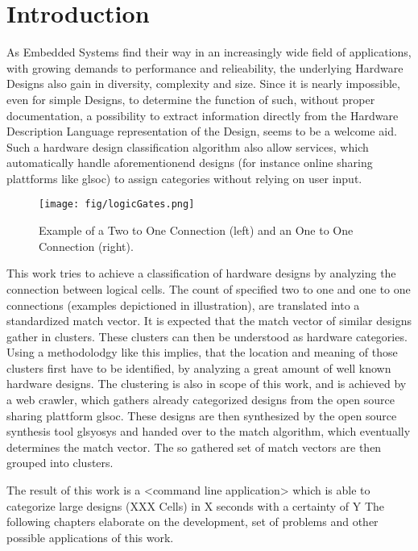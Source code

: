 
\section{Introduction}
As Embedded Systems find their way in an increasingly wide field of applications,
with growing demands to performance and relieability, the underlying Hardware 
Designs also gain in diversity, complexity and size. Since it is nearly impossible,
even for simple Designs, to determine the function of such, without proper
documentation, a possibility to extract information directly from the Hardware 
Description Language representation of the Design, seems to be a welcome aid.
Such a hardware design classification algorithm also allow services, which 
automatically handle aforementionend designs (for instance online sharing 
plattforms like gls{oc}) to assign categories without relying on user input.

\begin{figure}[h]
 \centering
 \texttt{[image: fig/logicGates.png]}
 \caption[Example of a Two to One Connection and an One to One Connection]{Example of a Two to One Connection (left) and an One to One Connection (right).}
 \label{fig:logicGates}
\end{figure}

This work tries to achieve a classification of hardware designs by analyzing the 
connection between logical cells. The count of specified two to one and one to 
one connections (examples depictioned in illustration), are translated into a
standardized match vector. It is expected that the match vector of similar designs
gather in clusters. These clusters can then be understood as hardware categories. 
Using a methodolodgy like this implies, that the location and meaning of those clusters first 
have to be identified, by analyzing a great amount of well known hardware designs.
The clustering is also in scope of this work, and is achieved by a web crawler,
which gathers already categorized designs from the open source sharing plattform 
gls{oc}. These designs are then synthesized by the open source synthesis tool 
gls{yosys} and handed over to the match algorithm, which eventually determines 
the match vector. The so gathered set of match vectors are then grouped into clusters.

The result of this work is a <command line application> which is able to 
categorize large designs (XXX Cells) in X seconds with a certainty of Y%
The following chapters elaborate on the development, set of problems and 
other possible applications of this work. 
  
